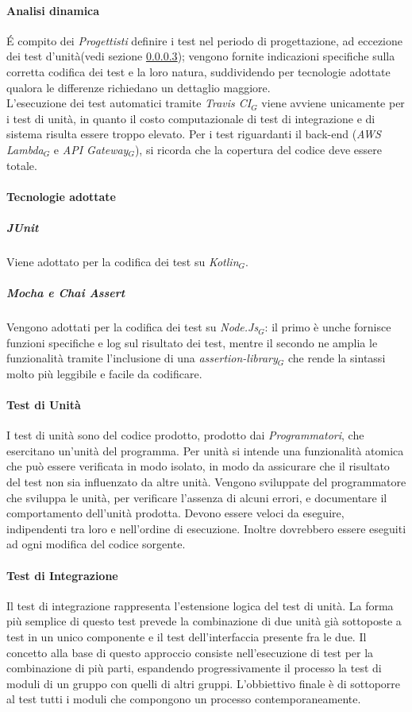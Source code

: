 \paragraph{Analisi dinamica}\label{anDinamica}
\'E compito dei \textit{Progettisti} definire i test nel periodo di progettazione, ad eccezione dei test d'unità(vedi sezione \ref{tunita}); vengono fornite indicazioni specifiche sulla corretta codifica dei test e la loro natura, suddividendo per tecnologie adottate qualora le differenze richiedano un dettaglio maggiore.\\
L'esecuzione dei test automatici tramite \textit{Travis CI$_{G}$} viene avviene unicamente per i test di unità, in quanto il costo computazionale di test di integrazione e di sistema risulta essere troppo elevato.
Per i test riguardanti il back-end (\textit{AWS Lambda$_{G}$} e \textit{API Gateway$_{G}$}), si ricorda che la copertura del codice deve essere totale.
\paragraph{Tecnologie adottate}
\subparagraph{JUnit} Viene adottato per la codifica dei test su \textit{Kotlin$_{G}$}.
\subparagraph{Mocha e Chai Assert} Vengono adottati per la codifica dei test su \textit{Node.Js$_{G}$}: il primo è unche fornisce funzioni specifiche e log sul risultato dei test, mentre il secondo ne amplia le funzionalità tramite l'inclusione di una \textit{assertion-library$_{G}$} che rende la sintassi molto più leggibile e facile da codificare.

\paragraph{Test di Unità}\label{tunita}
I test di unità sono del codice prodotto, prodotto dai \textit{Programmatori}, che esercitano un'unità del programma. Per unità si intende una funzionalità atomica che può essere verificata in modo isolato, in modo da assicurare che il risultato del test non sia influenzato da altre unità. 
Vengono sviluppate del programmatore che sviluppa le unità, per verificare l'assenza di alcuni errori, e documentare il comportamento dell'unità prodotta. 
Devono essere veloci da eseguire, indipendenti tra loro e nell'ordine di esecuzione. Inoltre dovrebbero essere eseguiti ad ogni modifica del codice sorgente.
\paragraph{Test di Integrazione}
Il test di integrazione rappresenta l'estensione logica del test di unità. La forma più semplice di questo test prevede la combinazione di due unità già sottoposte a test in un unico componente e il test dell'interfaccia presente fra le due. Il concetto alla base di questo approccio consiste nell'esecuzione di test per la combinazione di più parti, espandendo progressivamente il processo la test di moduli di un gruppo con quelli di altri gruppi. L'obbiettivo finale è di sottoporre al test tutti i moduli che compongono un processo contemporaneamente. 
